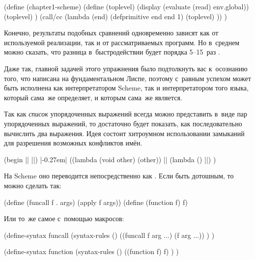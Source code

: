 \begin{code:lisp}
(define (chapter1-scheme)
  (define (toplevel)
    (display (evaluate (read) env.global))
    (toplevel) )
  (call/cc (lambda (end)
             (defprimitive end end 1)
             (toplevel) )) )
\end{code:lisp}



Конечно, результаты подобных сравнений одновременно зависят как от используемой
реализации, так и от рассматриваемых программ. Но в~среднем можно сказать, что
разница в~быстродействии будет порядка 5--15~раз \cite{itw86}.

Даже так, главной задачей этого упражнения было подтолкнуть вас к~осознанию
того, что  написана на фундаментальном Лиспе, поэтому с~равным
успехом может быть исполнена как интерпретатором Scheme, так и интерпретатором
того языка, который сама~же определяет, и которым сама~же является.



Так как \emph{список} упорядоченных выражений всегда можно представить в~виде
пар упорядоченных выражений, то достаточно будет показать, как последовательно
вычислить два выражения. Идея состоит хитроумном использовании замыканий для
разрешения возможных конфликтов имён.

{\def\expr#1{\sub{#1}}
\begin{code:lisp}
(begin |\expr{1}| |\expr{2}|) |\kern-0.27em\Equals|  ((lambda (void other) (other))
                                  |\expr{1}|
                                  (lambda () |\expr{2}|) )
\end{code:lisp}}




На Scheme оно переводится непосредственно как . Если быть
дотошным, то можно сделать так:

\begin{code:lisp}
(define (funcall f . args) (apply f args))
(define (function f) f)
\end{code:lisp}

\noindent
Или то~же самое с~помощью макросов:

\begin{code:lisp}
(define-syntax funcall
  (syntax-rules ()
    ((funcall f arg ...) (f arg ...)) ) )

(define-syntax function
  (syntax-rules ()
    ((function f) f) ) )
\end{code:lisp}


